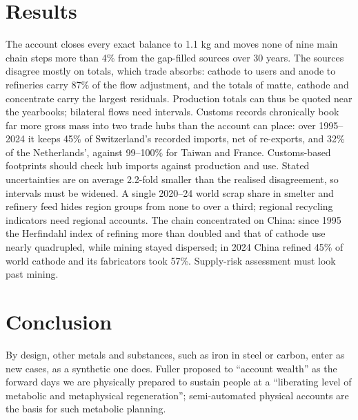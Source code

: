 \documentclass[11pt,a4paper]{article}
\begin{document}
\section*{Results}

The account closes every exact balance to 1.1 kg and moves none of nine main chain steps
more than 4\% from the gap-filled sources over 30 years. The sources disagree mostly on
totals, which trade absorbs: cathode to users and anode to refineries carry 87\% of the flow
adjustment, and the totals of matte, cathode and concentrate carry the largest residuals.
Production totals can thus be quoted near the yearbooks; bilateral flows need intervals.
Customs records chronically book far more gross mass into two trade hubs than the account
can place: over 1995--2024 it keeps 45\% of Switzerland's recorded imports, net of
re-exports, and 32\% of the Netherlands', against 99--100\% for Taiwan and France.
Customs-based footprints should check hub imports against production and use. Stated
uncertainties are on average 2.2-fold smaller than the realised disagreement, so intervals
must be widened. A single 2020--24 world scrap share in smelter and refinery feed hides
region groups from none to over a third; regional recycling indicators need regional
accounts. The chain concentrated on China: since 1995 the Herfindahl index of refining more
than doubled and that of cathode use nearly quadrupled, while mining stayed dispersed; in
2024 China refined 45\% of world cathode and its fabricators took 57\%. Supply-risk
assessment must look past mining.

\section*{Conclusion}

By design, other metals and substances, such as iron in steel or carbon, enter as new
cases, as a synthetic one does. Fuller proposed to ``account wealth'' as the forward days
we are physically prepared to sustain people at a ``liberating level of metabolic and
metaphysical regeneration''; semi-automated physical accounts are the basis for such
metabolic planning.
\end{document}
